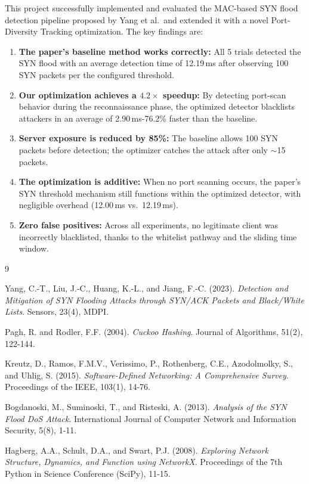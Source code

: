 \documentclass[12pt, a4paper]{article}
\begin{document}
This project successfully implemented and evaluated the MAC-based SYN flood detection pipeline proposed by Yang et al.\ and extended it with a novel Port-Diversity Tracking optimization. The key findings are:

\begin{enumerate}[itemsep=4pt]
    \item \textbf{The paper's baseline method works correctly:} All 5 trials detected the SYN flood with an average detection time of 12.19\,ms after observing 100 SYN packets per the configured threshold.
    \item \textbf{Our optimization achieves a $4.2\times$ speedup:} By detecting port-scan behavior during the reconnaissance phase, the optimized detector blacklists attackers in an average of 2.90\,ms-76.2\% faster than the baseline.
    \item \textbf{Server exposure is reduced by 85\%:} The baseline allows 100 SYN packets before detection; the optimizer catches the attack after only $\sim$15 packets.
    \item \textbf{The optimization is additive:} When no port scanning occurs, the paper's SYN threshold mechanism still functions within the optimized detector, with negligible overhead (12.00\,ms vs.\ 12.19\,ms).
    \item \textbf{Zero false positives:} Across all experiments, no legitimate client was incorrectly blacklisted, thanks to the whitelist pathway and the sliding time window.
\end{enumerate}

\vspace{10mm}

\begin{thebibliography}{9}

Yang, C.-T., Liu, J.-C., Huang, K.-L., and Jiang, F.-C. (2023).
\textit{Detection and Mitigation of SYN Flooding Attacks through SYN/ACK Packets and Black/White Lists}.
Sensors, 23(4), MDPI.

Pagh, R. and Rodler, F.F. (2004).
\textit{Cuckoo Hashing}.
Journal of Algorithms, 51(2), 122-144.

Kreutz, D., Ramos, F.M.V., Verissimo, P., Rothenberg, C.E., Azodolmolky, S., and Uhlig, S. (2015).
\textit{Software-Defined Networking: A Comprehensive Survey}.
Proceedings of the IEEE, 103(1), 14-76.

Bogdanoski, M., Suminoski, T., and Risteski, A. (2013).
\textit{Analysis of the SYN Flood DoS Attack}.
International Journal of Computer Network and Information Security, 5(8), 1-11.

Hagberg, A.A., Schult, D.A., and Swart, P.J. (2008).
\textit{Exploring Network Structure, Dynamics, and Function using NetworkX}.
Proceedings of the 7th Python in Science Conference (SciPy), 11-15.


\end{thebibliography}
\end{document}
